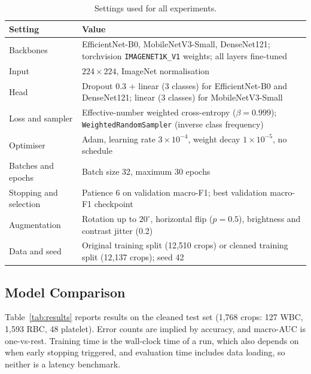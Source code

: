 \documentclass[11pt,a4paper]{article}
\begin{document}
\begin{table}[!t]
\centering
\caption{Settings used for all experiments.}
\label{tab:hyper}
\begin{tabular}{|>{\raggedright\arraybackslash}p{3.6cm}|>{\raggedright\arraybackslash}p{11.0cm}|}
\hline
\textbf{Setting} & \textbf{Value} \\
\hline
Backbones & EfficientNet-B0, MobileNetV3-Small, DenseNet121; torchvision \texttt{IMAGENET1K\_V1} weights; all layers fine-tuned \\
\hline
Input & \(224\times224\), ImageNet normalisation \\
\hline
Head & Dropout 0.3 + linear (3 classes) for EfficientNet-B0 and DenseNet121; linear (3 classes) for MobileNetV3-Small \\
\hline
Loss and sampler & Effective-number weighted cross-entropy (\(\beta=0.999\)); \texttt{WeightedRandomSampler} (inverse class frequency) \\
\hline
Optimiser & Adam, learning rate \(3\times10^{-4}\), weight decay \(1\times10^{-5}\), no schedule \\
\hline
Batches and epochs & Batch size 32, maximum 30 epochs \\
\hline
Stopping and selection & Patience 6 on validation macro-F1; best validation macro-F1 checkpoint \\
\hline
Augmentation & Rotation up to \(20^\circ\), horizontal flip (\(p=0.5\)), brightness and contrast jitter (0.2) \\
\hline
Data and seed & Original training split (12,510 crops) or cleaned training split (12,137 crops); seed 42 \\
\hline
\end{tabular}
\end{table}

\subsection{Model Comparison}

Table~\ref{tab:results} reports results on the cleaned test set (1,768 crops: 127 WBC, 1,593 RBC, 48 platelet). Error counts are implied by accuracy, and macro-AUC is one-vs-rest. Training time is the wall-clock time of a run, which also depends on when early stopping triggered, and evaluation time includes data loading, so neither is a latency benchmark.
\end{document}
